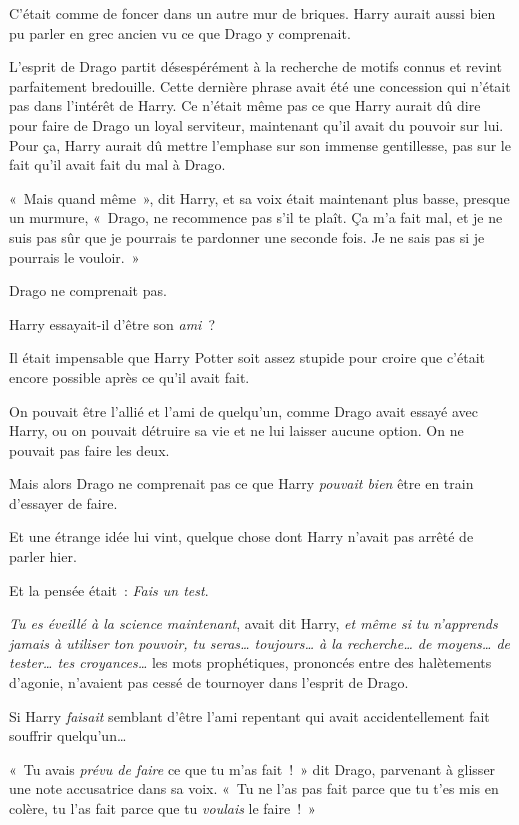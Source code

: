 C'était comme de foncer dans un autre mur de briques. Harry aurait aussi bien pu parler en grec ancien vu ce que Drago y comprenait.

L'esprit de Drago partit désespérément à la recherche de motifs connus et revint parfaitement bredouille. Cette dernière phrase avait été une concession qui n'était pas dans l'intérêt de Harry. Ce n'était même pas ce que Harry aurait dû dire pour faire de Drago un loyal serviteur, maintenant qu'il avait du pouvoir sur lui. Pour ça, Harry aurait dû mettre l'emphase sur son immense gentillesse, pas sur le fait qu'il avait fait du mal à Drago.

«~Mais quand même~», dit Harry, et sa voix était maintenant plus basse, presque un murmure, «~Drago, ne recommence pas s'il te plaît. Ça m'a fait mal, et je ne suis pas sûr que je pourrais te pardonner une seconde fois. Je ne sais pas si je pourrais le vouloir.~»

Drago ne comprenait pas.

Harry essayait-il d'être son \emph{ami}~?

Il était impensable que Harry Potter soit assez stupide pour croire que c'était encore possible après ce qu'il avait fait.

On pouvait être l'allié et l'ami de quelqu'un, comme Drago avait essayé avec Harry, ou on pouvait détruire sa vie et ne lui laisser aucune option. On ne pouvait pas faire les deux.

Mais alors Drago ne comprenait pas ce que Harry \emph{pouvait bien} être en train d'essayer de faire.

Et une étrange idée lui vint, quelque chose dont Harry n'avait pas arrêté de parler hier.

Et la pensée était~: \emph{Fais un test}.

\emph{Tu es éveillé à la science maintenant}, avait dit Harry, \emph{et même si tu n'apprends jamais à utiliser ton pouvoir, tu seras… toujours… à la recherche… de moyens… de tester… tes croyances…} les mots prophétiques, prononcés entre des halètements d'agonie, n'avaient pas cessé de tournoyer dans l'esprit de Drago.

Si Harry \emph{faisait} semblant d'être l'ami repentant qui avait accidentellement fait souffrir quelqu'un…

«~Tu avais \emph{prévu de faire} ce que tu m'as fait~!~» dit Drago, parvenant à glisser une note accusatrice dans sa voix. «~Tu ne l'as pas fait parce que tu t'es mis en colère, tu l'as fait parce que tu \emph{voulais} le faire~!~»


